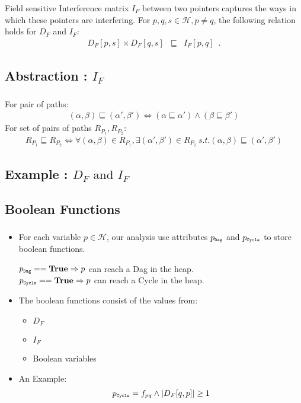 \documentclass[mathserif,10pt]{beamer}
\newcommand{\num}[1]{\ensuremath{|#1|}}
\newcommand{\Dag}{{\tt Dag}}
\newcommand{\Cycle}{{\tt Cycle}}
\newcommand{\p}{\ensuremath{p}}
\newcommand{\q}{\ensuremath{q}}
\newcommand{\s}{\ensuremath{s}}
\newcommand{\heap}{\ensuremath{\mathcal{H}}}
\newcommand{\DFM}[2]{\ensuremath{D_F[#1,#2]}}
\newcommand{\IFM}[2]{\ensuremath{I_F[#1,#2]}}
\newcommand{\subC}{\mbox{\scalebox{0.6}{\Cycle}}}
\newcommand{\subD}{\mbox{\scalebox{0.6}{\Dag}}}
\newcommand{\true}{\textbf{True}}
\begin{document}
{{{%
\begin{definition}\label{IFM_matrix}
Field sensitive Interference matrix $I_F$ between
two pointers captures the ways in which these pointers are
interfering.  For $\p, \q, \s \in \heap, \p \not= \q$,
the following relation holds for $D_F$ and $I_F$: 
\begin{eqnarray*}
  \DFM{p}{s} \times \DFM{q}{s} &\sqsubseteq&
  \IFM{p}{q} \enspace . \label {eq:rel-df-if}
\end{eqnarray*}
\end{definition}
}

\subsection{Abstraction : $I_F$}
\frame
{
	\frametitle{\subsecname}
	For pair of paths:
\begin{eqnarray*}
  (\alpha, \beta) \sqsubseteq (\alpha', \beta') 
  \Leftrightarrow 
   (\alpha \sqsubseteq \alpha')  \wedge
  (\beta \sqsubseteq  \beta')
\end{eqnarray*}
For set of pairs of paths $R_{P_1}, R_{P_2}$:
\begin{eqnarray*}
  R_{P_1} \sqsubseteq R_{P_2} \Leftrightarrow \forall
  (\alpha, \beta) \in
  R_{P_1}, \exists (\alpha', \beta') \in
  R_{P_2}\ s.t. (\alpha, \beta) \sqsubseteq (\alpha', \beta')
\end{eqnarray*}
}
}

\subsection{Example : $D_F \mbox{ and } I_F$}
\frame
{
	\frametitle{\subsecname}
	
}	

\subsection{Boolean Functions}
\frame
{
	\frametitle{\subsecname}
	\begin{itemize}
	\item For each variable $\p \in \heap$, our analysis use attributes $\p_{\subD}$ and $\p_{\subC}$ to store boolean functions. \\
	\begin{center}
			$\p_{\subD} == \true \Rightarrow \p$ can reach a Dag  in the heap.\\
			$\p_{\subC} == \true \Rightarrow \p$ can reach a Cycle  in the heap. 
	\end{center}
	\pause
	\item The boolean functions consist of the values from:
		\begin{itemize}
			\item $D_F$
			\item $I_F$ 
			\item Boolean variables
		\end{itemize}	
	\pause
	\item An Example:
	$$
			\p_{\subC} = f_{\p\q} \wedge \num{D_F[\q,\p]} \geq 1
	$$		
	\end{itemize}
}

}
\end{document}
